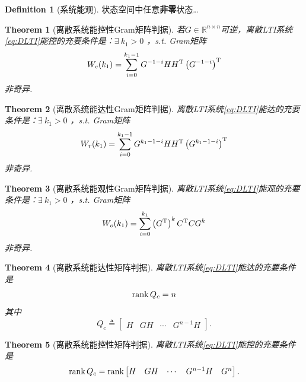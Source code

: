 \documentclass[14pt,a4paper]{article}
\theoremstyle{plain}
\newtheorem{thm}{Theorem}[section]
\theoremstyle{definition}
\newtheorem*{dfn}{Definition}
\theoremstyle{remark}
\theoremstyle{plain}
\theoremstyle{plain}
\theoremstyle{plain}
\theoremstyle{definition}
\theoremstyle{remark}
\numberwithin{equation}{section}
\begin{document}
			\begin{dfn}[系统能观]  
			\label{dfn:系统能观}
				状态空间中任意\textbf{非零}状态\ldots 
			\end{dfn}

			\begin{thm}[离散系统能控性Gram矩阵判据]  
			\label{the:离散系统能控性gram矩阵判据}
				若$G\in \mathbb{R}^{n\times n}$可逆，离散LTI系统\eqref{eq:DLTI}能控的充要条件是：$\exists \ k_1>0$ ，s.t. Gram矩阵
				\begin{equation}
				\label{eq:d_c_gramian}
				W_{c}(k_1) = \sum_{i=0}^{k_1-1} G^{-1-i}H H^{\textnormal{T}} \left( G^{-1-i} \right)^{\textnormal{T}}	
				\end{equation} 
				非奇异. 
			\end{thm} 

			\begin{thm}[离散系统能达性Gram矩阵判据]  
			\label{the:离散系统能达性gram矩阵判据}
				离散LTI系统\eqref{eq:DLTI}能达的充要条件是：$\exists \ k_1>0$ ，s.t. Gram矩阵
				\begin{equation}
				\label{eq:d_r_gramian}
				W_{r}(k_1) = \sum_{i=0}^{k_1-1} G^{k_1-1-i}H H^{\textnormal{T}} \left( G^{k_1-1-i} \right)^{\textnormal{T}}	
				\end{equation} 
				非奇异. 
			\end{thm} 

			\begin{thm}[离散系统能观性Gram矩阵判据]  
			\label{the:离散系统能观性gram矩阵判据}
				离散LTI系统\eqref{eq:DLTI}能观的充要条件是：$\exists \ k_1>0$ ，s.t. Gram矩阵
				\begin{equation}
				\label{eq:d_o_gramian}
				W_{o}(k_1) = \sum_{i=0}^{k_1} \left( G^{\textnormal{T}} \right)^{k} C^{\textnormal{T}} C G^{k} 
				\end{equation} 
				非奇异. 
					
			\end{thm} 

			\begin{thm}[离散系统能达性矩阵判据]  
			\label{the:离散系统能达性矩阵判据}
				离散LTI系统\eqref{eq:DLTI}能达的充要条件是
				\[
				\mathop{\textnormal{rank}} Q_c = n
				\] 
				其中
				\[
				Q_c \triangleq \begin{bmatrix}
					H & GH & \cdots & G^{n-1}H 
				\end{bmatrix} 
				.\] 
			\end{thm}

			\begin{thm}[离散系统能控性矩阵判据]  
			\label{the:离散系统能控性矩阵判据}
				离散LTI系统\eqref{eq:DLTI}能控的充要条件是
				\[
				\mathop{\textnormal{rank}} Q_c = \mathop{\textnormal{rank}} \begin{bmatrix}
					H & GH & \cdots & G^{n-1}H & G^n 
				\end{bmatrix} 
				.\] 
			\end{thm} 
\end{document}
